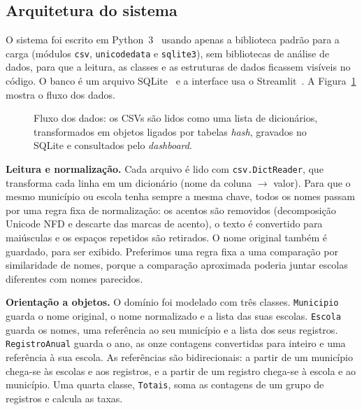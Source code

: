 \documentclass[preprint,10pt,5p]{elsarticle}
\begin{document}
\subsection{Arquitetura do sistema}

O sistema foi escrito em Python~3~\citep{vanrossum2009python} usando apenas a biblioteca padrão para a carga (módulos \texttt{csv}, \texttt{unicodedata} e \texttt{sqlite3}), sem bibliotecas de análise de dados, para que a leitura, as classes e as estruturas de dados ficassem visíveis no código. O banco é um arquivo SQLite~\citep{sqlite2026} e a interface usa o Streamlit~\citep{streamlit2026}. A Figura~\ref{fig:fluxo} mostra o fluxo dos dados.

\begin{figure}[h!]
\centering
{}
\caption{Fluxo dos dados: os CSVs são lidos como uma lista de dicionários, transformados em objetos ligados por tabelas \textit{hash}, gravados no SQLite e consultados pelo \textit{dashboard}.}
\label{fig:fluxo}
\end{figure}

\textbf{Leitura e normalização.} Cada arquivo é lido com \texttt{csv.DictReader}, que transforma cada linha em um dicionário (nome da coluna $\rightarrow$ valor). Para que o mesmo município ou escola tenha sempre a mesma chave, todos os nomes passam por uma regra fixa de normalização: os acentos são removidos (decomposição Unicode NFD e descarte das marcas de acento), o texto é convertido para maiúsculas e os espaços repetidos são retirados. O nome original também é guardado, para ser exibido. Preferimos uma regra fixa a uma comparação por similaridade de nomes, porque a comparação aproximada poderia juntar escolas diferentes com nomes parecidos.

\textbf{Orientação a objetos.} O domínio foi modelado com três classes. \texttt{Municipio} guarda o nome original, o nome normalizado e a lista das suas escolas. \texttt{Escola} guarda os nomes, uma referência ao seu município e a lista dos seus registros. \texttt{RegistroAnual} guarda o ano, as onze contagens convertidas para inteiro e uma referência à sua escola. As referências são bidirecionais: a partir de um município chega-se às escolas e aos registros, e a partir de um registro chega-se à escola e ao município. Uma quarta classe, \texttt{Totais}, soma as contagens de um grupo de registros e calcula as taxas.
\end{document}
